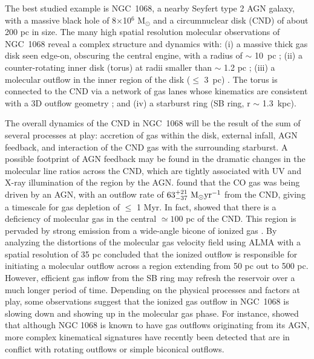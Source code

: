 \documentclass[fleqn,usenatbib]{mnras}
\begin{document}
The best studied example is NGC~1068, a nearby Seyfert type 2 AGN galaxy, with a massive black hole of 8$\times$10$^6$ M$_{\odot}$\citep{Lodato2003} and a  circumnuclear disk (CND) of about 200 pc in size. The many high spatial resolution molecular observations \citep[e.g.][]{Garcia-Burillo2014,Imanishi2018, Garcia-Burillo2016,Viti2014,Scourfield2020,Imanishi2020} of NGC~1068 reveal a complex structure and dynamics with: (i) a massive thick gas disk seen edge-on, obscuring the central engine, 
with a radius of $\sim$ 10~pc \citep{Garcia-Burillo2016,Imanishi2016, Imanishi2018}; (ii) a counter-rotating inner disk (torus) at radii smaller than $\sim$ 1.2 pc \citep{Impellizzeri2019}; (iii) a molecular outflow in the inner region of the disk ($\leq$ 3~pc) \citep{Gallimore2016,Garcia-Burillo2019,Impellizzeri2019}. The torus is connected to the CND via a network of gas lanes whose kinematics are consistent with a 3D outflow geometry \citep{Garcia-Burillo2019}; and  (iv)  a starburst ring (SB ring, r $\sim$ 1.3~kpc).


The overall dynamics of the CND in NGC~1068 will be the result of the sum of several processes at play:  accretion of gas within the disk, external infall, AGN feedback, and interaction of the CND gas with the surrounding starburst. A possible footprint of AGN feedback may be found in the dramatic changes in the molecular  line ratios across the CND, which are tightly associated with UV and X-ray illumination of the region by the AGN. \citet{Garcia-Burillo2014} found that the CO gas was being driven by an AGN, with an outflow rate of $63_{-37}^{+21}\ \rm M_{\odot} yr^{-1}$ from the CND, giving a timescale for gas depletion of $\leq$ 1 Myr. In fact, \citet{Garcia-Burillo2019} showed that there is a deficiency of molecular gas in the central $\simeq100$ pc of the CND. This region is pervaded by strong emission from a wide-angle bicone of ionized gas \citep{Das2006, MuellerSanchez2011, Barbosa2014}. By analyzing the distortions of the molecular gas velocity field using ALMA with a spatial resolution of 35 pc \citet{Garcia-Burillo2014} concluded that the ionized outflow is responsible for initiating a molecular outflow across a region extending from 50 pc out to 500 pc.  However, efficient gas inflow from the SB ring may refresh the reservoir over a much longer period of time. Depending on the physical processes and factors at play, some observations suggest that the ionized gas outflow in NGC~1068 is slowing down and showing up in the molecular gas phase. For instance, \cite{Shin2021} showed that although NGC 1068 is known to have gas outflows originating from its AGN, more complex kinematical signatures have recently been detected that are in conflict with rotating outflows or simple biconical outflows. 
\end{document}
